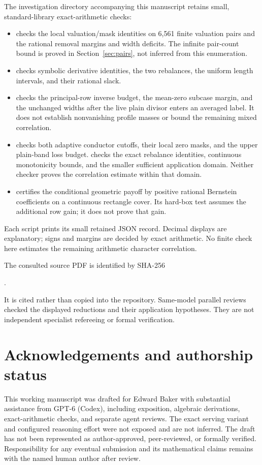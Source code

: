 \documentclass[11pt]{article}
\theoremstyle{definition}
\theoremstyle{remark}
\numberwithin{equation}{section}
\begin{document}
The investigation directory accompanying this manuscript retains
small, standard-library exact-arithmetic checks:
\begin{itemize}
\item {} checks the local
valuation/mask identities on 6,561 finite valuation pairs and the
rational removal margins and width deficits. The infinite pair-count
bound is proved in Section~\ref{sec:pairs}, not inferred from this
enumeration.
\item {} checks symbolic
derivative identities, the two rebalances, the uniform length
intervals, and their rational slack.
\item {} checks the
principal-row inverse budget, the mean-zero subcase margin, and
the unchanged widths after the live plain divisor enters an averaged
label. It does not establish nonvanishing profile masses or bound
the remaining mixed correlation.
\item {} checks both
adaptive conductor cutoffs, their local zero masks, and the upper
plain-band loss budget. 
checks the exact rebalance identities, continuous monotonicity bounds,
and the smaller sufficient application domain. Neither checker proves
the correlation estimate within that domain.
\item {} certifies the
conditional geometric payoff by positive rational Bernstein
coefficients on a continuous rectangle cover. Its hard-box test
assumes the additional row gain; it does not prove that gain.
\end{itemize}
Each script prints its small retained JSON record. Decimal displays
are explanatory; signs and margins are decided by exact arithmetic.
No finite check here estimates the remaining arithmetic character
correlation.

The consulted source PDF is identified by SHA-256
\begin{center}\small
{}.
\end{center}
It is cited rather than copied into the repository. Same-model
parallel reviews checked the displayed reductions and their
application hypotheses. They are not independent specialist
refereeing or formal verification.

\section*{Acknowledgements and authorship status}
This working manuscript was drafted for Edward Baker with substantial
assistance from GPT-6 (Codex), including exposition, algebraic
derivations, exact-arithmetic checks, and separate agent reviews.
The exact serving variant and configured reasoning effort were not
exposed and are not inferred. The draft has not been represented as
author-approved, peer-reviewed, or formally verified. Responsibility
for any eventual submission and its mathematical claims remains with
the named human author after review.
\end{document}

